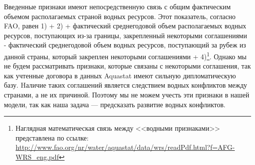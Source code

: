 \documentclass[a4paper, 12pt]{article}
\theoremstyle{plain} %
\theoremstyle{definition} %
\theoremstyle{remark} %
\begin{document}
Введенные признаки имеют непосредственную связь с общим фактическим объемом располагаемых страной водных ресурсов. Этот показатель, согласно FAO, равен 1) + 2) + фактический среднегодовой объем располагаемых водных ресурсов, поступающих из-за границы, закрепленный некоторыми соглашениями - фактический среднегодовой объем водных ресурсов, поступающий за рубеж из данной страны, который закреплен некоторыми соглашениями + 4)\footnote{Наглядная математическая связь между <<водными признаками>> представлена по ссылке: \url{http://www.fao.org/nr/water/aquastat/data/wrs/readPdf.html?f=AFG-WRS_eng.pdf}}. Однако мы не будем рассматривать признаки, которые связаны с некоторыми соглашения, так как учтенные договора в данных Aquastat имеют сильную дипломатическую базу. Hаличие таких соглашений является следствием водных конфликтов между странами, а не их причиной. Поэтому мы не можем учесть эти признаки в нашей модели, так как наша задача --- предсказать развитие водных конфликтов. 
\end{document}

